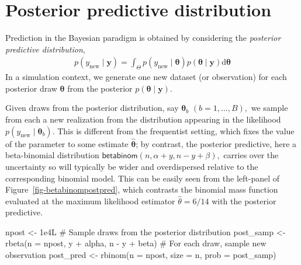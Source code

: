 \documentclass[
  11pt,
  letterpaper,
]{scrbook}
\newenvironment{Shaded}{\begin{snugshade}}{\end{snugshade}}
\newcommand{\AttributeTok}[1]{\textcolor[rgb]{0.40,0.45,0.13}{#1}}
\newcommand{\CommentTok}[1]{\textcolor[rgb]{0.37,0.37,0.37}{#1}}
\newcommand{\FloatTok}[1]{\textcolor[rgb]{0.68,0.00,0.00}{#1}}
\newcommand{\FunctionTok}[1]{\textcolor[rgb]{0.28,0.35,0.67}{#1}}
\newcommand{\NormalTok}[1]{\textcolor[rgb]{0.00,0.23,0.31}{#1}}
\newcommand{\OtherTok}[1]{\textcolor[rgb]{0.00,0.23,0.31}{#1}}
\newcommand{\SpecialCharTok}[1]{\textcolor[rgb]{0.37,0.37,0.37}{#1}}
\theoremstyle{plain}
\theoremstyle{plain}
\theoremstyle{plain}
\theoremstyle{definition}
\theoremstyle{definition}
\theoremstyle{definition}
\theoremstyle{remark}
\begin{document}
\section{Posterior predictive
distribution}\label{posterior-predictive-distribution}

Prediction in the Bayesian paradigm is obtained by considering the
\emph{posterior predictive distribution}, \begin{align*}
p(y_{\text{new}} \mid \boldsymbol{y}) =
\int_{\Theta} p(y_{\text{new}}  \mid \boldsymbol{\theta}) p(\boldsymbol{\theta} \mid  \boldsymbol{y}) \mathrm{d} \boldsymbol{\theta}
\end{align*} In a simulation context, we generate one new dataset (or
observation) for each posterior draw \(\boldsymbol{\theta}\) from the
posterior \(p(\boldsymbol{\theta} \mid  \boldsymbol{y}).\)

Given draws from the posterior distribution, say
\(\boldsymbol{\theta}_b\) \((b=1, \ldots, B),\) we sample from each a
new realization from the distribution appearing in the likelihood
\(p(y_{\text{new}}  \mid \boldsymbol{\theta}_b).\) This is different
from the frequentist setting, which fixes the value of the parameter to
some estimate \(\widehat{\boldsymbol{\theta}}\); by contrast, the
posterior predictive, here a beta-binomial distribution
\(\mathsf{beta binom}(n, \alpha + y, n - y + \beta),\) carries over the
uncertainty so will typically be wider and overdispersed relative to the
corresponding binomial model. This can be easily seen from the
left-panel of Figure~\ref{fig-betabinompostpred}, which contrasts the
binomial mass function evaluated at the maximum likelihood estimator
\(\widehat{\theta}=6/14\) with the posterior predictive.

\begin{Shaded}
\begin{Highlighting}[]
\NormalTok{npost }\OtherTok{\textless{}{-}} \FloatTok{1e4}\NormalTok{L}
\CommentTok{\# Sample draws from the posterior distribution}
\NormalTok{post\_samp }\OtherTok{\textless{}{-}} \FunctionTok{rbeta}\NormalTok{(}\AttributeTok{n =}\NormalTok{ npost, y }\SpecialCharTok{+}\NormalTok{ alpha, n }\SpecialCharTok{{-}}\NormalTok{ y }\SpecialCharTok{+}\NormalTok{ beta)}
\CommentTok{\# For each draw, sample new observation}
\NormalTok{post\_pred }\OtherTok{\textless{}{-}} \FunctionTok{rbinom}\NormalTok{(}\AttributeTok{n =}\NormalTok{ npost, }\AttributeTok{size =}\NormalTok{ n, }\AttributeTok{prob =}\NormalTok{ post\_samp)}
\end{Highlighting}
\end{Shaded}
\end{document}
